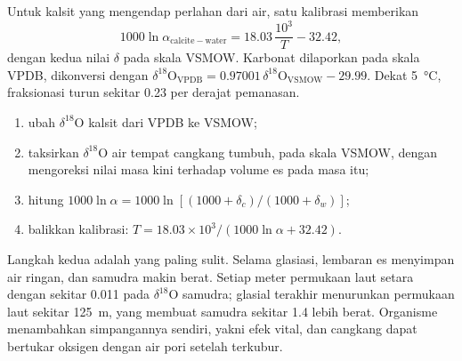Untuk kalsit yang mengendap perlahan dari air, satu kalibrasi memberikan
\[
1000\ln\alpha_{\mathrm{calcite-water}} = 18.03\,\frac{10^3}{T} - 32.42,
\]
dengan kedua nilai $\delta$ pada skala VSMOW. Karbonat dilaporkan pada skala
VPDB, dikonversi dengan $\delta^{18}\mathrm O_{\mathrm{VPDB}} =
0.97001\,\delta^{18}\mathrm O_{\mathrm{VSMOW}} - 29.99$. Dekat \qty{5}{\celsius}, fraksionasi
turun sekitar \qty{0.23}{\permil} per derajat pemanasan.

\begin{method}\label{met:b3:stable-isotopes:palaeotemperature}
\begin{enumerate}
\item ubah $\delta^{18}\mathrm O$ kalsit dari VPDB ke VSMOW;
\item taksirkan $\delta^{18}\mathrm O$ air tempat cangkang tumbuh, pada
skala VSMOW, dengan mengoreksi nilai masa kini terhadap volume es pada masa itu;
\item hitung $1000\ln\alpha = 1000\ln[(1000 + \delta_c)/(1000 + \delta_w)]$;
\item balikkan kalibrasi: $T = 18.03\times10^3/(1000\ln\alpha + 32.42)$.
\end{enumerate}
\end{method}

Langkah kedua adalah yang paling sulit. Selama glasiasi, lembaran es menyimpan
air ringan, dan samudra makin berat. Setiap meter permukaan laut setara dengan
sekitar \qty{0.011}{\permil} pada $\delta^{18}\mathrm O$ samudra; glasial terakhir
menurunkan permukaan laut sekitar \qty{125}{m}, yang membuat samudra sekitar
\qty{1.4}{\permil} lebih berat. Organisme menambahkan simpangannya sendiri, yakni
efek vital, dan cangkang dapat bertukar oksigen dengan air pori setelah terkubur.

